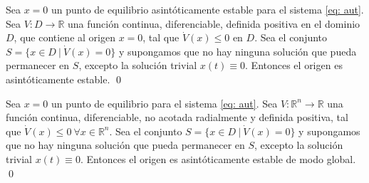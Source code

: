 \begin{corollary}
Sea $x=0$ un punto de equilibrio asintóticamente estable para el sistema \ref{eq: aut}. Sea $V:D\to 	\mathbb{R}$ una función continua, diferenciable, definida positiva en el dominio $D$, que contiene al origen $x=0$, tal que $\dot V(x) \leq 0$ en $D$. Sea el conjunto $S=\{ x \in D\ |\ \dot V(x) = 0 \}$ y supongamos que no hay ninguna solución que pueda permanecer en $S$, excepto la solución trivial $x(t)\equiv 0$. Entonces el origen es asintóticamente estable.
\qed
\end{corollary}

\begin{corollary}
Sea $x=0$ un punto de equilibrio para el sistema \ref{eq: aut}. Sea $V:\mathbb{R}^n \to \mathbb{R}$ una función continua, diferenciable, no acotada radialmente y definida positiva, tal que $\dot V(x) \leq 0\ \forall x \in \mathbb{R}^n$.  Sea el conjunto $S=\{ x \in D\ |\ \dot V(x) = 0 \}$ y supongamos que no hay ninguna solución que pueda permanecer en $S$, excepto la solución trivial $x(t)\equiv 0$. Entonces el origen es asintóticamente estable de modo global.
\qed
\end{corollary}

